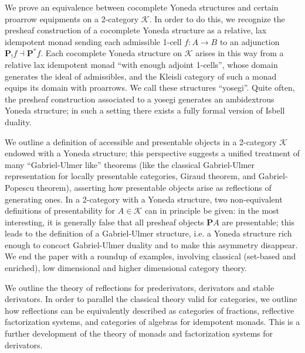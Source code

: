 \begin{eyenumerate}
   \item {}
   {{\small{}}}
   {We prove an equivalence between cocomplete Yoneda structures and certain proarrow equipments on a 2-category $\mathcal K$. In order to do this, we recognize the presheaf construction of a cocomplete Yoneda structure as a relative, lax idempotent monad sending each admissible 1-cell $f :A \to B$ to an adjunction $\boldsymbol{P}_!f\dashv\boldsymbol{P}^*f$. Each cocomplete Yoneda structure on $\mathcal K$ arises in this way from a relative lax idempotent monad ``with enough adjoint 1-cells'', whose domain generates the ideal of admissibles, and the Kleisli category of such a monad equips its domain with proarrows. We call these structures ``yosegi''. Quite often, the presheaf construction associated to a yosegi generates an ambidextrous Yoneda structure; in such a setting there exists a fully formal version of Isbell duality.}
   \item {}
   {}
   {We outline a definition of accessible and presentable objects in a 2-category $\mathcal K$ endowed with a Yoneda structure; this perspective suggests a unified treatment of many ``Gabriel-Ulmer like'' theorems (like the classical Gabriel-Ulmer representation for locally presentable categories, Giraud theorem, and Gabriel-Popescu theorem), asserting how presentable objects arise as reflections of generating ones. In a 2-category with a Yoneda structure, two non-equivalent definitions of presentability for $A\in\mathcal K$ can in principle be given: in the most interesting, it is generally false that all presheaf objects $\boldsymbol{P}A$ are presentable; this leads to the definition of a Gabriel-Ulmer structure, i.e. a Yoneda structure rich enough to concoct Gabriel-Ulmer duality and to make this asymmetry disappear. We end the paper with a roundup of examples, involving classical (set-based and enriched), low dimensional and higher dimensional category theory.}
   \item {}
   {}
   {We outline the theory of reflections for prederivators, derivators and stable derivators. In order to parallel the classical theory valid for categories, we outline how reflections can be equivalently described as categories of fractions, reflective factorization systems, and categories of algebras for idempotent monads. This is a further development of the theory of monads and factorization systems for derivators.}

\end{eyenumerate}
